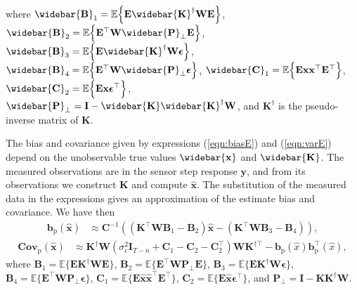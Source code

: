 where $\widebar{\mathbf{B}}_1 = \mathbb{E} \Big\{ \mathbf{E} \widebar{\mathbf{K}}^\dagger \mathbf{W} \mathbf{E} \Big\}$, $\widebar{\mathbf{B}}_2 = \mathbb{E} \Big\{ \mathbf{E}^\top \mathbf{W} \widebar{\mathbf{P}}_\perp \mathbf{E} \Big\}$, $\widebar{\mathbf{B}}_3 = \mathbb{E} \Big\{ \mathbf{E} \widebar{\mathbf{K}}^\dagger \mathbf{W} \bm{\epsilon} \Big\}$, $\widebar{\mathbf{B}}_4 = \mathbb{E} \Big\{ \mathbf{E}^\top \mathbf{W} \widebar{\mathbf{P}}_\perp \bm{\epsilon} \Big\}$, $\widebar{\mathbf{C}}_1 = \mathbb{E} \Big\{ \mathbf{E} \mathbf{x} \mathbf{x}^\top \mathbf{E}^\top \Big\}$, \linebreak $\widebar{\mathbf{C}}_2 = \mathbb{E} \Big\{ \mathbf{E} \mathbf{x} \bm{\epsilon}^\top \Big\}$, $\widebar{\mathbf{P}}_\perp = \mathbf{I} - \widebar{\mathbf{K}} \widebar{\mathbf{K}}^\dagger \mathbf{W}$, and $\mathbf{K}^\dagger$ is the pseudo-inverse matrix of $\mathbf{K}$. 

The bias and covariance given by expressions (\ref{eqn:biasE}) and (\ref{eqn:varE}) depend on the unobservable true values $\widebar{\mathbf{x}}$ and $\widebar{\mathbf{K}}$.
The measured observations are in the sensor step response $\mathbf{y}$, and from its observations we construct $\mathbf{K}$ and compute $\widehat{\mathbf{x}}$.
The substitution of the measured data in the expressions gives an approximation of the estimate bias and covariance. 
We have then
\begin{equation} \begin{aligned} \mathbf{b}_{\mathrm{p}} \left( \widehat{\mathbf{x}} \right) & \approx \mathbf{C}^{-1} \left(  \left( \mathbf{K}^\top \mathbf{W} \mathbf{B}_1 - \mathbf{B}_2 \right) \widehat{\mathbf{x}} - \left( \mathbf{K}^\top \mathbf{W} \mathbf{B}_3 - \mathbf{B}_4 \right) \right), \end{aligned} \label{eqn:biasST} \end{equation}
  \begin{equation} \begin{aligned} {\mathrm{\mathbf{Cov}}}_{\mathrm{p}} \left( \widehat{\mathbf{x}} \right) & \approx \mathbf{K}^\dagger \mathbf{W} \left( \sigma_{\epsilon}^2 \mathbf{I}_{T-n} + \mathbf{C}_1 - \mathbf{C}_2 - \mathbf{C}_2^\top \right) \mathbf{W} \mathbf{K}^{\dagger \top} - \mathbf{b}_{\mathrm{p}} \left( \widehat{x} \right) \mathbf{b}_{\mathrm{p}}^\top \left( \widehat{x} \right), \end{aligned} \label{eqn:varST} \end{equation}
  where $\mathbf{B}_1 = \mathbb{E} \Big\{ \mathbf{E} \mathbf{K}^\dagger \mathbf{W} \mathbf{E} \Big\}$, $\mathbf{B}_2 = \mathbb{E} \Big\{ \mathbf{E}^\top \mathbf{W} \mathbf{P}_\perp \mathbf{E} \Big\}$, $\mathbf{B}_3 = \mathbb{E} \Big\{ \mathbf{E} \mathbf{K}^\dagger \mathbf{W} \bm{\epsilon} \Big\}$, $\mathbf{B}_4 = \mathbb{E} \Big\{ \mathbf{E}^\top \mathbf{W} \mathbf{P}_\perp \bm{\epsilon} \Big\}$, $\mathbf{C}_1 = \mathbb{E} \Big\{ \mathbf{E} \widehat{\mathbf{x}} \widehat{\mathbf{x}}^\top \mathbf{E}^\top \Big\}$, $\mathbf{C}_2 = \mathbb{E} \Big\{ \mathbf{E} \widehat{\mathbf{x}} \bm{\epsilon}^\top \Big\}$, and $\mathbf{P}_\perp = \mathbf{I} - \mathbf{K} \mathbf{K}^\dagger \mathbf{W}$. 

